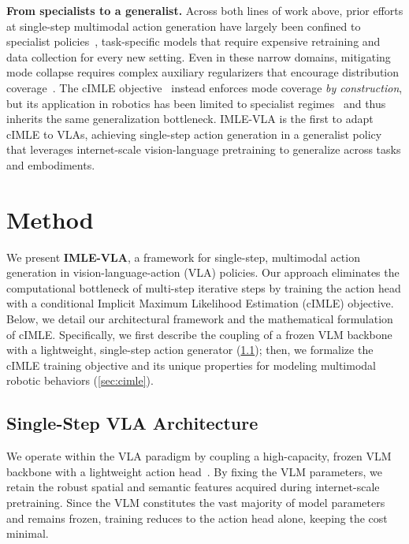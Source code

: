 \documentclass[letterpaper, 10 pt, conference]{ieeeconf}  %
\begin{document}
\textbf{From specialists to a generalist.}
Across both lines of work above, prior efforts at single-step multimodal action generation have largely been confined to specialist policies~\cite{prasad2024consistency,wang2024onedp,frans2025shortcut}, task-specific models that require expensive retraining and data collection for every new setting. Even in these narrow domains, mitigating mode collapse requires complex auxiliary regularizers that encourage distribution coverage~\cite{zou2025dm1,dmpo2025}. The cIMLE objective~\cite{imle} instead enforces mode coverage \emph{by construction}, but its application in robotics has been limited to specialist regimes~\cite{rana2025imlepolicy,Bhaskar2026PRISMPR,Dong2026FromFT,Lee2026ImplicitML} and thus inherits the same generalization bottleneck. IMLE-VLA is the first to adapt cIMLE to VLAs, achieving single-step action generation in a generalist policy that leverages internet-scale vision-language pretraining to generalize across tasks and embodiments.


\section{Method}\label{sec:method}
We present \textbf{IMLE-VLA}, a framework for single-step, multimodal action generation in vision-language-action (VLA) policies. Our approach eliminates the computational bottleneck of multi-step iterative steps by training the action head with a conditional Implicit Maximum Likelihood Estimation (cIMLE) objective. Below, we detail our architectural framework and the mathematical formulation of cIMLE. Specifically, we first describe the coupling of a frozen VLM backbone with a lightweight, single-step action generator (\ref{sec:arch}); then, we formalize the cIMLE training objective and its unique properties for modeling multimodal robotic behaviors (\ref{sec:cimle}).

\subsection{Single-Step VLA Architecture}\label{sec:arch}
We operate within the VLA paradigm by coupling a high-capacity, frozen VLM backbone with a lightweight action head~\cite{black2024pi0,black2025pi05,ghosh2024octo,wang2024cogact}. By fixing the VLM parameters, we retain the robust spatial and semantic features acquired during internet-scale pretraining. Since the VLM constitutes the vast majority of model parameters and remains frozen, training reduces to the action head alone, keeping the cost minimal. 
\end{document}
